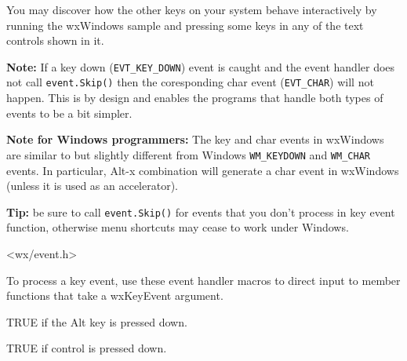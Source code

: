 You may discover how the other keys on your system behave interactively by
running the  wxWindows sample and pressing some keys
in any of the text controls shown in it.

{\bf Note:} If a key down ({\tt EVT\_KEY\_DOWN}) event is caught and
the event handler does not call {\tt event.Skip()} then the coresponding
char event ({\tt EVT\_CHAR}) will not happen.  This is by design and
enables the programs that handle both types of events to be a bit
simpler.

{\bf Note for Windows programmers:} The key and char events in wxWindows are
similar to but slightly different from Windows {\tt WM\_KEYDOWN} and
{\tt WM\_CHAR} events. In particular, Alt-x combination will generate a char
event in wxWindows (unless it is used as an accelerator).

{\bf Tip:} be sure to call {\tt event.Skip()} for events that you don't process in
key event function, otherwise menu shortcuts may cease to work under Windows.




<wx/event.h>


To process a key event, use these event handler macros to direct input to member
functions that take a wxKeyEvent argument.

\twocolwidtha{7cm}
\begin{twocollist}\itemsep=0pt
\end{twocollist}%





TRUE if the Alt key is pressed down.



TRUE if control is pressed down.

